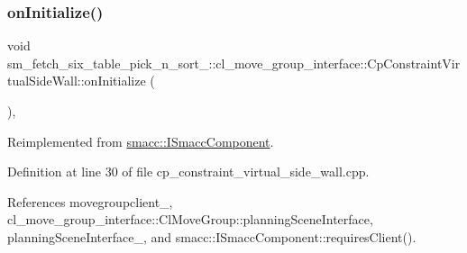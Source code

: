 \subsubsection{\texorpdfstring{on\+Initialize()}{onInitialize()}}
{\footnotesize\ttfamily void sm\+\_\+fetch\+\_\+six\+\_\+table\+\_\+pick\+\_\+n\+\_\+sort\+\_\+::cl\+\_\+move\+\_\+group\+\_\+interface\+::\+Cp\+Constraint\+Virtual\+Side\+Wall\+::on\+Initialize (\begin{DoxyParamCaption}{ }\end{DoxyParamCaption})\hspace{0.3cm}{\ttfamily [override]}, {\ttfamily [virtual]}}



Reimplemented from \hyperlink{classsmacc_1_1ISmaccComponent_ae6f71d008db12553912e9436184b9e65}{smacc\+::\+I\+Smacc\+Component}.



Definition at line 30 of file cp\+\_\+constraint\+\_\+virtual\+\_\+side\+\_\+wall.\+cpp.



References movegroupclient\+\_\+, cl\+\_\+move\+\_\+group\+\_\+interface\+::\+Cl\+Move\+Group\+::planning\+Scene\+Interface, planning\+Scene\+Interface\+\_\+, and smacc\+::\+I\+Smacc\+Component\+::requires\+Client().


